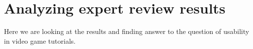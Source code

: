 \chapter{Analyzing expert review results}

Here we are looking at the results and finding answer to the question of usability in video game tutorials.